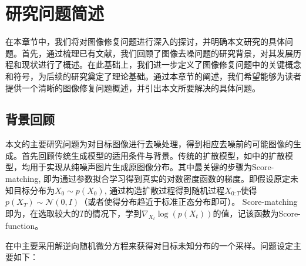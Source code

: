 \chapter{研究问题简述}
在本章节中，我们将对图像修复问题进行深入的探讨，并明确本文研究的具体问题。首先，通过梳理已有文献，我们回顾了图像去噪问题的研究背景，对其发展历程和现状进行了概述。在此基础上，我们进一步定义了图像修复问题中的关键概念和符号，为后续的研究奠定了理论基础。通过本章节的阐述，我们希望能够为读者提供一个清晰的图像修复问题概述，并引出本文所要解决的具体问题。
\section{背景回顾}
本文的主要研究问题为对目标图像进行去噪处理，得到相应去噪前的可能图像的生成。首先回顾传统生成模型的适用条件与背景。传统的扩散模型，如\cite{song_2,DDPM,DDIM}中的扩散模型，均用于实现从纯噪声图片生成原图像分布。其中最关键的步骤为Score-matching, 即为通过参数拟合学习得到真实的对数密度函数的梯度。即假设原定未知目标分布为$X_0\sim p(X_0)$, 通过构造扩散过程得到随机过程$X_{0:T}$使得$p(X_{T})\sim \mathcal{N}(0,I)$（或者使得分布趋近于标准正态分布即可）。 Score-matching即为，在选取较大的$T$的情况下，学到$\nabla_{X_t}\log (p(X_t))$的值，记该函数为Score-function。     

在\cite{song_2}中主要采用解逆向随机微分方程来获得对目标未知分布的一个采样。问题设定主要如下：   

